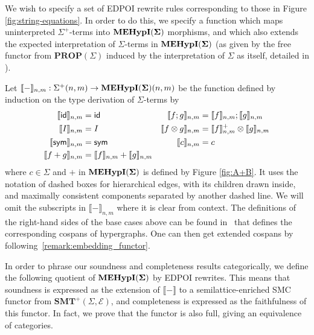 We wish to specify a set of EDPOI rewrite rules corresponding to those in Figure \ref{fig:string-equations}.  In order to do this,  we specify a function which maps  uninterpreted $\Sigma^+$-terms into ${\mathbf{MEHypI(\Sigma)}}$ morphisms,  and which also extends the expected interpretation of $\Sigma$-terms in ${\mathbf{MEHypI(\Sigma)}}$ (as given by the free functor from $\textbf{PROP}(\Sigma)$ induced by the interpretation of $\Sigma$ as itself,  detailed in \cite{bonchi_string_2022-2}). 
\begin{definition}[Interpretation function] 
Let $\llbracket - \rrbracket_{n,m}: \Sigma^+(n,m) \to {\mathbf{MEHypI(\Sigma)}}(n,m)$ be the function defined by induction on the type derivation of $\Sigma$-terms by 
\begin{align*}
	\llbracket \textsf{id} \rrbracket_{n,m} &= \textsf{id}  &	\llbracket f ; g \rrbracket_{n,m} &= \llbracket f \rrbracket_{n,m} ; \llbracket g \rrbracket_{n,m} \\
	\llbracket I \rrbracket_{n,m} &= I & \llbracket f \otimes g \rrbracket_{n,m} &= \llbracket f \rrbracket^+_{n,m} \otimes \llbracket g \rrbracket_{n,m} \\
	\llbracket \textsf{sym} \rrbracket_{n,m} &= \textsf{sym}  & \llbracket c \rrbracket_{n,m} &= c   \\ 
	\llbracket f+g \rrbracket_{n,m} &= \llbracket f \rrbracket_{n,m} + \llbracket g \rrbracket_{n,m}
\end{align*}
where $c \in \Sigma$ and $+$ in ${\mathbf{MEHypI(\Sigma)}}$ is defined by Figure \ref{fig:A+B}.  It uses the notation of dashed boxes for hierarchical edges, with its children drawn inside,  and maximally consistent components separated by another dashed line.  We will omit the subscripts in $\llbracket - \rrbracket_{n,m}$ where it is clear from context.
The definitions of the right-hand sides of the base cases above can be found in~\cite{bonchi_string_2022-1} that defines the corresponding cospans of hypergraphs. One can then get extended cospans by following~\ref{remark:embedding_functor}.
\end{definition}

In order to phrase our soundness and completeness results categorically,  we define the following quotient of ${\mathbf{MEHypI(\Sigma)}}$ by EDPOI rewrites.  This means that soundness is expressed as the extension of $\llbracket - \rrbracket$ to a semilattice-enriched SMC functor from $\textbf{SMT}^+(\Sigma, \mathcal E)$,  and completeness is expressed as the faithfulness of this functor.  In fact,  we prove that the functor is also full,  giving an equivalence of categories. 

